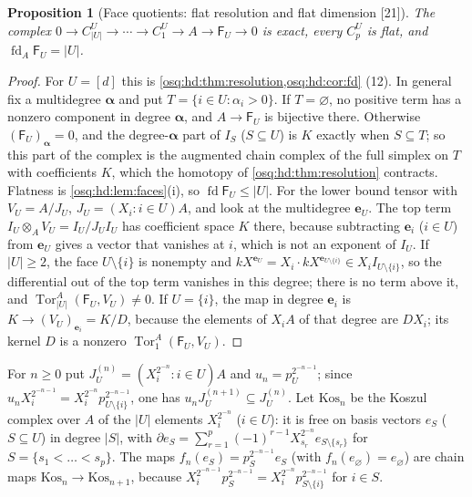\documentclass[11pt,letterpaper]{article}
\numberwithin{equation}{section}
\newtheorem{proposition}[proposition]{Proposition}
\theoremstyle{definition}
\theoremstyle{remark}
\theoremstyle{plain}
\newcommand{\Tor}{\operatorname{Tor}}
\newcommand{\fd}{\operatorname{fd}}
\newcommand{\src}[1]{\textup{\textsf{[#1]}}}
\begin{document}
\begin{proposition}[Face quotients: flat resolution and flat dimension \src{21}]\label{osq:da:prop:faces}
The complex $0\to C^U_{|U|}\to\cdots\to C^U_1\to A\to\mathsf F_U\to0$ is exact, every $C^U_p$ is flat, and $\fd_A\mathsf F_U=|U|$.
\end{proposition}
\begin{proof}
For $U=[d]$ this is \cref{osq:hd:thm:resolution,osq:hd:cor:fd} (12). In general fix a multidegree $\boldsymbol\alpha$ and put
$T=\{i\in U:\alpha_i>0\}$. If $T=\varnothing$, no positive term has a nonzero component in degree $\boldsymbol\alpha$, and $A\to\mathsf F_U$
is bijective there. Otherwise $(\mathsf F_U)_{\boldsymbol\alpha}=0$, and the degree-$\boldsymbol\alpha$ part of $I_S$ ($S\subseteq U$) is $K$
exactly when $S\subseteq T$; so this part of the complex is the augmented chain complex of the full simplex on $T$ with coefficients $K$,
which the homotopy of \cref{osq:hd:thm:resolution} contracts. Flatness is \cref{osq:hd:lem:faces}(i), so $\fd\mathsf F_U\le|U|$.
For the lower bound tensor with $V_U=A/J_U$, $J_U=(X_i:i\in U)A$, and look at the multidegree $\mathbf e_U$. The top term
$I_U\otimes_AV_U=I_U/J_UI_U$ has coefficient space $K$ there, because subtracting $\mathbf e_i$ ($i\in U$) from $\mathbf e_U$ gives a vector
that vanishes at $i$, which is not an exponent of $I_U$. If $|U|\ge2$, the face $U\setminus\{i\}$ is nonempty and
$kX^{\mathbf e_U}=X_i\cdot kX^{\mathbf e_{U\setminus\{i\}}}\in X_iI_{U\setminus\{i\}}$, so the differential out of the top term vanishes in
this degree; there is no term above it, and $\Tor^A_{|U|}(\mathsf F_U,V_U)\ne0$. If $U=\{i\}$, the map in degree $\mathbf e_i$ is
$K\to(V_U)_{\mathbf e_i}=K/D$, because the elements of $X_iA$ of that degree are $DX_i$; its kernel $D$ is a nonzero
$\Tor^A_1(\mathsf F_U,V_U)$.
\end{proof}

For $n\ge0$ put $J^{(n)}_U=(X_i^{2^{-n}}:i\in U)A$ and $u_n=p_U^{2^{-n-1}}$; since
$u_nX_i^{2^{-n-1}}=X_i^{2^{-n}}p_{U\setminus\{i\}}^{2^{-n-1}}$, one has $u_nJ^{(n+1)}_U\subseteq J^{(n)}_U$. Let $\mathrm{Kos}_n$ be the
Koszul complex over $A$ of the $|U|$ elements $X_i^{2^{-n}}$ ($i\in U$): it is free on basis vectors $e_S$ ($S\subseteq U$) in degree $|S|$,
with $\partial e_S=\sum_{r=1}^p(-1)^{r-1}X_{s_r}^{2^{-n}}e_{S\setminus\{s_r\}}$ for $S=\{s_1<\dots<s_p\}$. The maps
$f_n(e_S)=p_S^{2^{-n-1}}e_S$ (with $f_n(e_\varnothing)=e_\varnothing$) are chain maps $\mathrm{Kos}_n\to\mathrm{Kos}_{n+1}$, because
$X_i^{2^{-n-1}}p_S^{2^{-n-1}}=X_i^{2^{-n}}p_{S\setminus\{i\}}^{2^{-n-1}}$ for $i\in S$.
\end{document}
